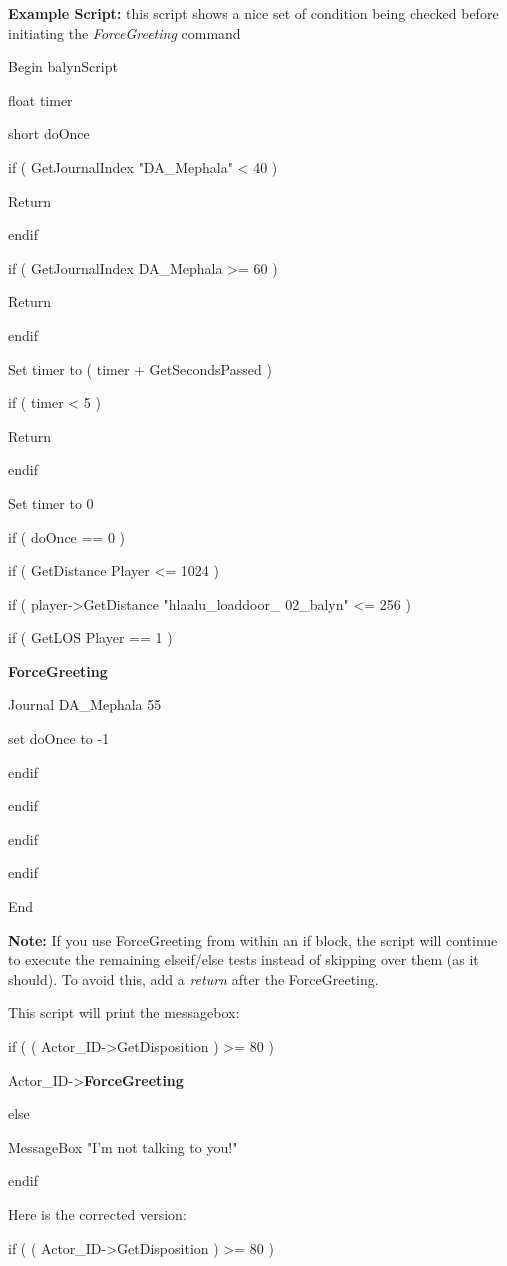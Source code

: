 \documentclass[
]{article}
\begin{document}
\textbf{Example Script:} this script shows a nice set of condition being
checked before initiating the \emph{ForceGreeting} command

Begin balynScript

float timer

short doOnce

if ( GetJournalIndex "DA\_Mephala" \textless{} 40 )

Return

endif

if ( GetJournalIndex DA\_Mephala \textgreater= 60 )

Return

endif

Set timer to ( timer + GetSecondsPassed )

if ( timer \textless{} 5 )

Return

endif

Set timer to 0

if ( doOnce == 0 )

if ( GetDistance Player \textless= 1024 )

if ( player-\textgreater GetDistance "hlaalu\_loaddoor\_ 02\_balyn"
\textless= 256 )

if ( GetLOS Player == 1 )

\textbf{ForceGreeting}

Journal DA\_Mephala 55

set doOnce to -1

endif

endif

endif

endif

End

\textbf{Note:} If you use ForceGreeting from within an if block, the
script will continue to execute the remaining elseif/else tests instead
of skipping over them (as it should). To avoid this, add a \emph{return}
after the ForceGreeting.

This script will print the messagebox:

if ( ( Actor\_ID-\textgreater GetDisposition ) \textgreater= 80 )

Actor\_ID-\textgreater{}\textbf{ForceGreeting}

else

MessageBox "I'm not talking to you!"

endif

Here is the corrected version:

if ( ( Actor\_ID-\textgreater GetDisposition ) \textgreater= 80 )
\end{document}
